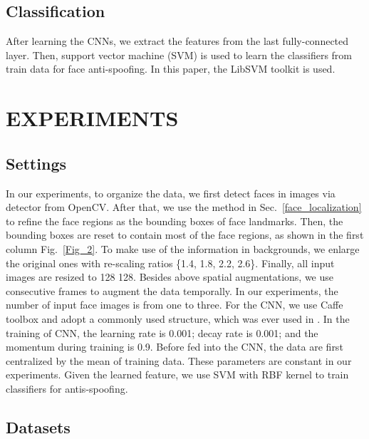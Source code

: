 \documentclass[letterpaper, 10 pt, conference]{ieeeconf}
\begin{document}
\subsection{Classification}

After learning the CNNs, we extract the features from the last fully-connected layer. Then, support vector machine (SVM) is used to learn the classifiers from train data for face anti-spoofing. In this paper, the LibSVM toolkit \cite{Chang01libsvm:a} is used.

\section{EXPERIMENTS}

\subsection{Settings}

In our experiments, to organize the data, we first detect faces in images via detector from OpenCV. After that, we use the method in Sec.~\ref{face_localization} to refine the face regions as the bounding boxes of face landmarks. Then, the bounding boxes are reset to contain most of the face regions, as shown in the first column Fig.~\ref{Fig_2}. To make use of the information in backgrounds, we enlarge the original ones with re-scaling ratios \{1.4, 1.8, 2.2, 2.6\}. Finally, all input images are resized to 128  128. Besides above spatial augmentations, we use consecutive frames to augment the data temporally. In our experiments, the number of input face images is from one to three. For the CNN, we use Caffe toolbox \cite{Jia13caffe} and adopt a commonly used structure, which was ever used in \cite{DBLP:conf/nips/KrizhevskySH12}. In the training of CNN, the learning rate is 0.001; decay rate is 0.001; and the momentum during training is 0.9. Before fed into the CNN, the data are first centralized by the mean of training data. These parameters are constant in our experiments. Given the learned feature, we use SVM with RBF kernel to train classifiers for antis-spoofing.

\subsection{Datasets}
\end{document}
